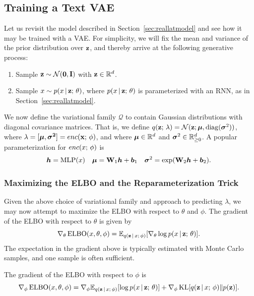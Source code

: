 \documentclass{article}
\begin{document}
\subsection{Training a Text VAE}\label{app}
Let us revisit the model described in Section~\ref{sec:reallatmodel} and see how it may be trained with a VAE. For simplicity, we will fix the mean and variance of the prior distribution over $\mathbf{z}$, and thereby arrive at the following generative process:
\begin{enumerate}
    \item Sample $\mathbf{z} \sim \mathcal{N}(\mathbf{0}, \mathbf{I})$ with $\mathbf{z} \in \mathbb{R}^d$.
    \item Sample $x \sim p(x \,|\, \mathbf{z} ; \, \theta)$, where $p(x \,|\, \mathbf{z} ; \, \theta)$ is parameterized with an RNN, as in Section~\ref{sec:reallatmodel}.
\end{enumerate}
We now define the variational family $\mathcal{Q}$ to contain Gaussian distributions with diagonal covariance matrices. That is, we define $q(\mathbf{z} ; \, \lambda) = \mathcal{N}(\mathbf{z}; \boldsymbol{\mu}, \mathrm{diag}(\boldsymbol{\sigma}^2))$, where
$\lambda = [\boldsymbol{\mu}, \boldsymbol{\sigma^2} ] = enc(\mathbf{x} ; \, \phi)$, and where $\boldsymbol{\mu} \in \mathbb{R}^d$ and $\boldsymbol{\sigma}^2 \in \mathbb{R}_{\geq 0}^d$. 
A popular parameterization for $enc(x ; \, \phi)$ is 
\begin{align*}
    \boldsymbol{h} = \operatorname*{MLP}(x) & & \boldsymbol{\mu} = \mathbf{W}_1 \boldsymbol{h} + \boldsymbol{b}_1  && \boldsymbol{\sigma}^2 = \exp(\mathbf{W}_2 \boldsymbol{h} + \boldsymbol{b}_2 ).
\end{align*} 

\subsubsection{Maximizing the ELBO and the Reparameterization Trick}
Given the above choice of variational family and approach to predicting $\lambda$, we may now attempt to maximize the ELBO with respect to $\theta$ and $\phi$. The gradient of the ELBO with respect to $\theta$ is given by
\[\nabla_\theta \operatorname*{ELBO}(x, \theta,\phi) = \mathbb{E}_{q(\mathbf{z} \,|\, x ; \, \phi)} [\nabla_\theta \log p(x \,|\, \mathbf{z} ; \, \theta)].  \]
The expectation in the gradient above is typically estimated with Monte Carlo samples, and one sample is often sufficient.

The gradient of the ELBO with respect to $\phi$ is
\[ \nabla_\phi \operatorname*{ELBO}(x, \theta, \phi) = \nabla_\phi \mathbb{E}_{q(\mathbf{z} \,|\, x ; \, \phi)} [ \log p(x \,|\, \mathbf{z} ; \, \theta)] + \nabla_\phi \operatorname*{KL}[q(\mathbf{z} \,|\, x ; \, \phi)  \Vert  p(\mathbf{z})].\]
\end{document}
